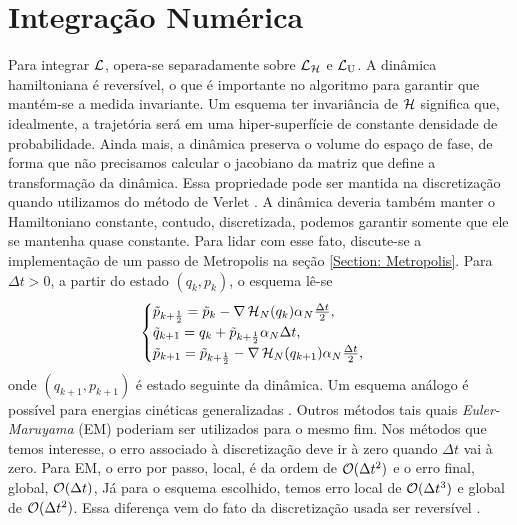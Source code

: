 \section{Integração Numérica}
\label{Seção: Discretização}

Para integrar $\operatorname{\mathcal{L}}$, opera-se separadamente sobre $\operatorname{\mathcal{L}}_{\operatorname{\mathcal{H}}}$ e $\operatorname{\mathcal{L}}_{\operatorname{U}}$. A dinâmica hamiltoniana é reversível, o que é importante no algoritmo para garantir que mantém-se a medida invariante.  Um esquema ter invariância de $\operatorname{\mathcal{H}}$ significa que, idealmente, a trajetória será em uma hiper-superfície de constante densidade de probabilidade. Ainda mais, a dinâmica preserva o volume do espaço de fase, de forma que não precisamos calcular o jacobiano da matriz que define a transformação da dinâmica. Essa propriedade pode ser mantida na discretização quando utilizamos do método de Verlet \cite{Chafa2018}\cite[Capítulo~2]{leimmolecular}. A dinâmica deveria também manter o Hamiltoniano constante, contudo, discretizada, podemos garantir somente que ele se mantenha quase constante. Para lidar com esse fato, discute-se a implementação de um passo de Metropolis na seção \ref{Section: Metropolis}. Para $\Delta t > 0$, a partir do estado $(q_k, p_k)$, o esquema lê-se
\begin{equation}
\begin{cases}
	\tilde{p}_{k+\frac{1}{2}} = \tilde{p}_k - \nabla \operatorname{\mathcal{H}}_N(q_k) \alpha_N \frac{\Delta t}{2}, \\
	\tilde{q}_{k+1} = q_k + \tilde{p}_{k + \frac{1}{2}} \alpha_N \Delta t, \\
	\tilde{p}_{k+1} = \tilde{p}_{k+\frac{1}{2}} - \nabla \operatorname{\mathcal{H}}_N(q_{k+1}) \alpha_N \frac{\Delta t}{2},
\end{cases}
\label{Equation: Verlet}
\end{equation}
onde $(q_{k+1}, p_{k+1})$ é estado seguinte da dinâmica. Um esquema análogo é possível para energias cinéticas generalizadas \cite{Stoltz2018}. Outros métodos tais quais \textit{Euler-Maruyama} (EM) \cite[Capítulo~7]{leimmolecular} poderiam ser utilizados para o mesmo fim. Nos métodos que temos interesse, o erro associado à discretização deve ir à zero quando $\Delta t$ vai à zero. Para EM, o erro por passo, local, é da ordem de $\mathcal{O}{(\Delta t^2)}$ e o erro final, global, $\mathcal{O}{(\Delta t)}$, Já para o esquema escolhido, temos erro local de  $\mathcal{O}{(\Delta t^3)}$ e global de  $\mathcal{O}{(\Delta t^2)}$. Essa diferença vem do fato da discretização usada ser reversível \cite[Capítulo~5]{handbookmontecarlo}. 

